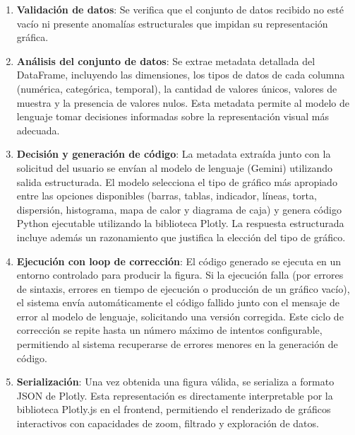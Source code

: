 \begin{enumerate}
      \item \textbf{Validación de datos}: Se verifica que el conjunto de datos
            recibido no esté vacío ni presente anomalías estructurales que impidan su
            representación gráfica.

      \item \textbf{Análisis del conjunto de datos}: Se extrae metadata detallada
            del DataFrame, incluyendo las dimensiones, los tipos de datos de cada columna
            (numérica, categórica, temporal), la cantidad de valores únicos, valores de
            muestra y la presencia de valores nulos. Esta metadata permite al modelo de
            lenguaje tomar decisiones informadas sobre la representación visual más
            adecuada.

      \item \textbf{Decisión y generación de código}: La metadata extraída junto con
            la solicitud del usuario se envían al modelo de lenguaje (Gemini) utilizando
            salida estructurada. El modelo selecciona el tipo de gráfico más apropiado
            entre las opciones disponibles (barras, tablas, indicador, líneas, torta, dispersión, histograma,
            mapa de calor y diagrama de caja) y genera código Python ejecutable utilizando
            la biblioteca Plotly. La respuesta estructurada incluye además un razonamiento
            que justifica la elección del tipo de gráfico.

      \item \textbf{Ejecución con loop de corrección}: El código generado se ejecuta
            en un entorno controlado para producir la figura. Si la ejecución falla (por
            errores de sintaxis, errores en tiempo de ejecución o producción de un gráfico
            vacío), el sistema envía automáticamente el código fallido junto con el
            mensaje de error al modelo de lenguaje, solicitando una versión corregida.
            Este ciclo de corrección se repite hasta un número máximo de intentos
            configurable, permitiendo al sistema recuperarse de errores menores en la
            generación de código.

      \item \textbf{Serialización}: Una vez obtenida una figura válida, se serializa
            a formato JSON de Plotly. Esta representación es directamente interpretable
            por la biblioteca Plotly.js en el frontend, permitiendo el renderizado de
            gráficos interactivos con capacidades de zoom, filtrado y exploración de
            datos.
\end{enumerate}

